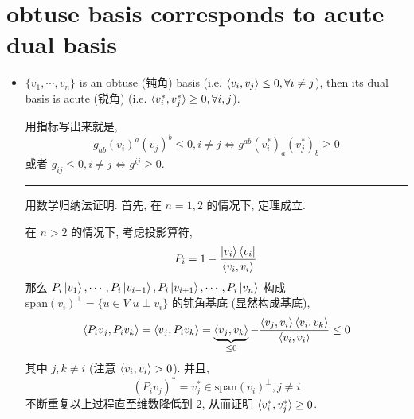 \section{obtuse basis corresponds to acute dual basis} \label{A.4}
\begin{itemize}
	\item $\{v_1, \cdots, v_n\}$ is an obtuse (钝角) basis (i.e. $\braket{v_i, v_j} \leq 0, \forall i \neq j$), then its dual basis is acute (锐角) (i.e. $\braket{v_i^*, v_j^*} \geq 0, \forall i, j$).
	
	\begin{tcolorbox}[title=proof:]
		用指标写出来就是,
		\begin{equation}
			g_{a b} (v_i)^a (v_j)^b \leq 0, i \neq j \iff g^{a b} (v_i^*)_a (v_j^*)_b \geq 0
		\end{equation}
		或者 $g_{i j} \leq 0, i \neq j \iff g^{i j} \geq 0$.
		
		\noindent\rule[0.5ex]{\linewidth}{0.5pt} %
		
		用数学归纳法证明. 首先, 在 $n = 1, 2$ 的情况下, 定理成立.
		
		在 $n > 2$ 的情况下, 考虑投影算符,
		\begin{equation}
			P_i = 1 - \frac{\ket{v_i} \bra{v_i}}{\braket{v_i, v_i}}
		\end{equation}
		那么 $P_i \ket{v_1}, \cdots, P_i \ket{v_{i - 1}}, P_i \ket{v_{i + 1}}, \cdots, P_i \ket{v_n}$ 构成 $\mathrm{span}(v_i)^\perp = \{u \in V | u \perp v_i\}$ 的钝角基底 (显然构成基底),
		\begin{equation}
			\braket{P_i v_j, P_i v_k} = \braket{v_j, P_i v_k} = \underbrace{\braket{v_j, v_k}}_{\leq 0} - \frac{\braket{v_j, v_i} \braket{v_i, v_k}}{\braket{v_i, v_i}} \leq 0
		\end{equation}
		其中 $j, k \neq i$ (注意 $\braket{v_i, v_i} > 0$). 并且,
		\begin{equation}
			(P_i v_j)^* = v_j^* \in \mathrm{span}(v_i)^\perp, j \neq i
		\end{equation}
		不断重复以上过程直至维数降低到 $2$, 从而证明 $\braket{v_i^*, v_j^*} \geq 0$.
	\end{tcolorbox}
\end{itemize}
